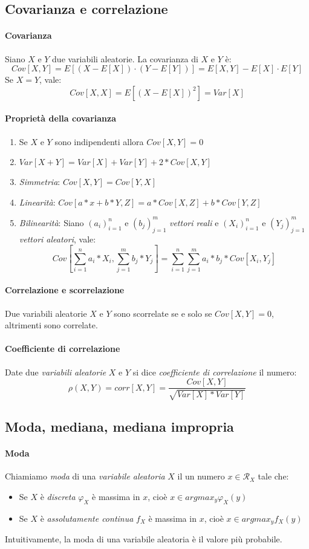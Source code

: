 \documentclass[12pt, a4paper]{report}
\theoremstyle{definition}
\begin{document}
\subsection{Covarianza e correlazione}
\paragraph{Covarianza}
Siano $X$ e $Y$ due variabili aleatorie. La covarianza di $X$ e $Y$ è:
\[Cov[X,Y]=E[(X-E[X])\cdot(Y-E[Y])]=E[X,Y]-E[X]\cdot E[Y]\]
Se $X=Y$, vale:
\[Cov[X,X]=E[(X-E[X])^2]=Var[X]\]
\paragraph{Proprietà della covarianza}
\begin{enumerate}[label=(\roman*)]
	\item Se $X$ e $Y$ sono indipendenti allora \(Cov[X,Y]=0\)
	\item \(Var[X+Y]=Var[X]+Var[Y]+2*Cov[X,Y]\)
	\item \emph{Simmetria}: \(Cov[X,Y]=Cov[Y,X]\)
	\item \emph{Linearità}: \(Cov[a*x+b*Y,Z]=a*Cov[X,Z]+b*Cov[Y,Z]\)
	\item \emph{Bilinearità}: Siano $(a_i)_{i=1}^n$ e $(b_j)_{j=1}^m$
	\emph{vettori reali} e $(X_i)_{i=1}^n$ e $(Y_j)_{j=1}^m$ \emph{vettori aleatori},
vale:
\[Cov\left[\sum_{i=1}^na_i*X_i,\sum_{j=1}^mb_j*Y_j\right]=\sum_{i=1}^n
\sum_{j=1}^ma_i*b_j*Cov[X_i,Y_j]\]
\end{enumerate}
\paragraph{Correlazione e scorrelazione}
Due variabili aleatorie $X$ e $Y$ sono scorrelate se e solo se $Cov[X,Y]=0$,
altrimenti sono correlate.
\paragraph{Coefficiente di correlazione}
Date due \emph{variabili aleatorie} $X$ e $Y$ si dice \emph{coefficiente di
correlazione} il numero:
\[\rho(X,Y)=corr[X,Y]=\frac{Cov[X,Y]}{\sqrt{Var[X]*Var[Y]}}\]

\subsection{Moda, mediana, mediana impropria}
\paragraph{Moda}
Chiamiamo \emph{moda} di una \emph{variabile aleatoria} $X$ il un numero
$x\in\mathcal{R}_X$ tale che:
\begin{itemize}
    \item Se $X$ è \emph{discreta} $\varphi_X$ è massima in $x$, cioè \(x\in
    argmax_y\varphi_X(y)\)
    \item Se $X$ è \emph{assolutamente continua} $f_X$ è massima in $x$, cioè
    \(x\in argmax_y f_X(y)\)
\end{itemize}
Intuitivamente, la moda di una variabile aleatoria è il valore più probabile.
\end{document}
